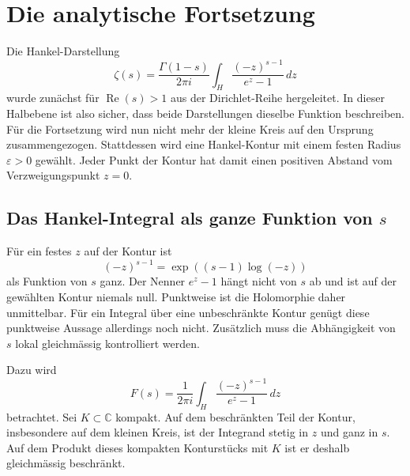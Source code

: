 %
%
%
%
\section{Die analytische Fortsetzung
\label{hankel:section:fortsetzung}}

Die Hankel-Darstellung
\begin{equation}
\zeta(s)
=
\frac{\Gamma(1-s)}{2\pi i}
\int_H
\frac{(-z)^{s-1}}{e^z-1}
\,dz
\label{hankel:eq:hankel-ausgangspunkt}
\end{equation}
wurde zunächst für $\operatorname{Re}(s)>1$ aus der Dirichlet-Reihe hergeleitet. 
In dieser Halbebene ist also sicher, dass beide Darstellungen dieselbe Funktion beschreiben. 
Für die Fortsetzung wird nun nicht mehr der kleine Kreis auf den Ursprung zusammengezogen. 
Stattdessen wird eine Hankel-Kontur mit einem festen Radius $\varepsilon>0$ gewählt. 
Jeder Punkt der Kontur hat damit einen positiven Abstand vom Verzweigungspunkt $z=0$.

\subsection{Das Hankel-Integral als ganze Funktion von $s$}

Für ein festes $z$ auf der Kontur ist
\begin{equation}
(-z)^{s-1}
=
\exp((s-1)\log(-z))
\label{hankel:eq:potenz-entire-s}
\end{equation}
als Funktion von $s$ ganz. 
Der Nenner $e^z-1$ hängt nicht von $s$ ab und ist auf der gewählten Kontur niemals null. 
Punktweise ist die Holomorphie daher unmittelbar. 
Für ein Integral über eine unbeschränkte Kontur genügt diese punktweise Aussage allerdings noch nicht.
Zusätzlich muss die Abhängigkeit von $s$ lokal gleichmässig kontrolliert werden.

Dazu wird
\begin{equation}
F(s)
=
\frac{1}{2\pi i}
\int_H
\frac{(-z)^{s-1}}{e^z-1}
\,dz
\label{hankel:eq:F-definition}
\end{equation}
betrachtet. 
Sei $K\subset\mathbb C$ kompakt. 
Auf dem beschränkten Teil der Kontur, insbesondere auf dem kleinen Kreis, ist der Integrand stetig in $z$ und ganz in $s$. 
Auf dem Produkt dieses kompakten Konturstücks mit $K$ ist er deshalb gleichmässig beschränkt.

